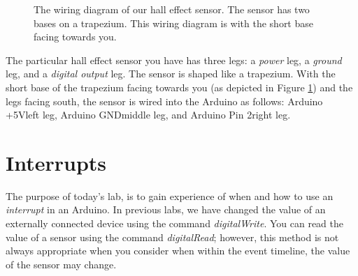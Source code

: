 \documentclass[11pt,a4paper]{article}
\begin{document}
\begin{figure}[ht]
    \begin{center}
    \end{center}
    \caption{The wiring diagram of our hall effect sensor. The sensor has two bases on a trapezium. This wiring diagram is with the short base facing towards you.}
    \label{fig:hall-effect-sensor}
\end{figure}

\noindent
The particular hall effect sensor you have has three legs: a \textit{power} leg, a \textit{ground} leg, and a \textit{digital output} leg. The sensor is shaped like a trapezium. With the short base of the trapezium facing towards you (as depicted in Figure \ref{fig:hall-effect-sensor}) and the legs facing south, the sensor is wired into the Arduino as follows: Arduino +5V\textrightarrow left leg, Arduino GND\textrightarrow middle leg, and Arduino Pin 2\textrightarrow right leg.\\

\section*{Interrupts}
The purpose of today's lab, is to gain experience of when and how to use an \textit{interrupt} in an Arduino. In previous labs, we have changed the value of an externally connected device using the command \textit{digitalWrite}. You can read the value of a sensor using the command \textit{digitalRead}; however, this method is not always appropriate when you consider when within the event timeline, the value of the sensor may change.\\
\end{document}
